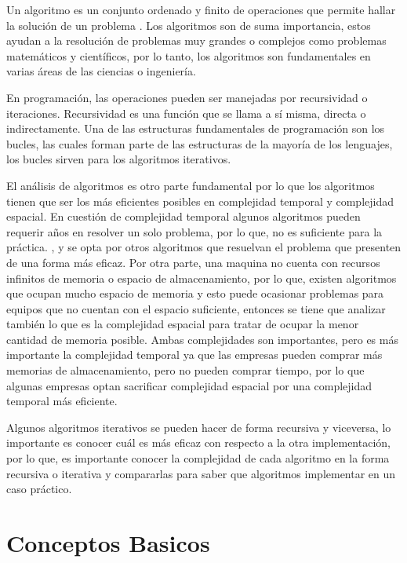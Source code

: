\documentclass[12pt,twoside]{article}
\begin{document}
Un algoritmo es un conjunto ordenado y finito de operaciones que permite hallar la solución de un problema \cite{algoritmo}. 
Los algoritmos son de suma importancia, estos ayudan a la resolución de problemas muy grandes o complejos como problemas matemáticos y científicos, por lo tanto, los 
algoritmos son fundamentales en varias áreas de las ciencias o ingeniería.

\par 
En programación, las operaciones pueden ser manejadas por recursividad o iteraciones. 
Recursividad es una función que se llama a sí misma, directa o indirectamente. Una de las estructuras fundamentales de programación son los bucles, 
las cuales forman parte de las estructuras de la mayoría de los lenguajes, los bucles sirven para los algoritmos iterativos. \cite{recuranditet}

\medskip

El análisis de algoritmos es otro parte fundamental por lo que los algoritmos tienen que ser los más eficientes posibles en complejidad temporal y complejidad espacial. 
En cuestión de complejidad temporal algunos algoritmos 
pueden requerir años en resolver un solo problema, por lo que, no es suficiente para la práctica.
, y se opta por otros algoritmos que resuelvan el problema que presenten de una forma más eficaz. Por otra parte, una maquina no cuenta con recursos infinitos de memoria o espacio de almacenamiento, por lo que, existen 
algoritmos que ocupan mucho espacio de memoria y esto puede ocasionar problemas para equipos que no cuentan con el espacio suficiente, entonces se tiene que analizar también lo que es la complejidad espacial para tratar de ocupar 
la menor cantidad de memoria posible. Ambas complejidades son importantes, pero es más importante la complejidad 
temporal ya que las empresas pueden comprar más memorias de almacenamiento, pero no pueden comprar tiempo, por lo que algunas empresas optan sacrificar complejidad espacial por una complejidad temporal más eficiente.

\medskip

Algunos algoritmos iterativos se pueden hacer de forma recursiva y viceversa, lo importante es conocer cuál es más eficaz con respecto a la otra implementación, por lo que, es importante conocer la complejidad de cada algoritmo en 
la forma recursiva o iterativa y compararlas para saber que algoritmos implementar en un caso práctico. 

\newpage


\newpage
\section{Conceptos Basicos}
\end{document}

